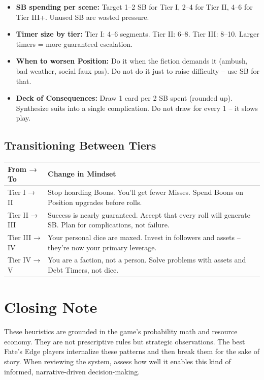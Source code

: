 \documentclass[11pt]{article}
\begin{document}
\begin{itemize}
    \item \textbf{SB spending per scene:} Target 1–2 SB for Tier I, 2–4 for Tier II, 4–6 for Tier III+. Unused SB are wasted pressure.
    \item \textbf{Timer size by tier:} Tier I: 4–6 segments. Tier II: 6–8. Tier III: 8–10. Larger timers = more guaranteed escalation.
    \item \textbf{When to worsen Position:} Do it when the fiction demands it (ambush, bad weather, social faux pas). Do not do it just to raise difficulty – use SB for that.
    \item \textbf{Deck of Consequences:} Draw 1 card per 2 SB spent (rounded up). Synthesize suits into a single complication. Do not draw for every 1 – it slows play.
\end{itemize}

\subsection*{Transitioning Between Tiers}

\begin{table}[h]
\centering
\begin{tabular}{ll}
\toprule
\textbf{From → To} & \textbf{Change in Mindset} \\
\midrule
Tier I → II & Stop hoarding Boons. You'll get fewer Misses. Spend Boons on Position upgrades before rolls. \\
Tier II → III & Success is nearly guaranteed. Accept that every roll will generate SB. Plan for complications, not failure. \\
Tier III → IV & Your personal dice are maxed. Invest in followers and assets – they're now your primary leverage. \\
Tier IV → V & You are a faction, not a person. Solve problems with assets and Debt Timers, not dice. \\
\bottomrule
\end{tabular}
\end{table}

\section*{Closing Note}

These heuristics are grounded in the game's probability math and resource economy. They are not prescriptive rules but strategic observations. The best Fate's Edge players internalize these patterns and then break them for the sake of story. When reviewing the system, assess how well it enables this kind of informed, narrative-driven decision-making.
\end{document}
